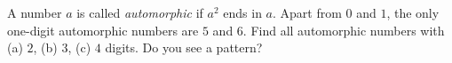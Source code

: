 A number $a$ is called \emph{automorphic} if $a^2$ ends in $a$. Apart from $0$ and $1$, the only one-digit automorphic numbers are $5$ and $6$. Find all automorphic numbers with (a) $2$, (b) $3$, (c) $4$ digits. Do you see a pattern?
